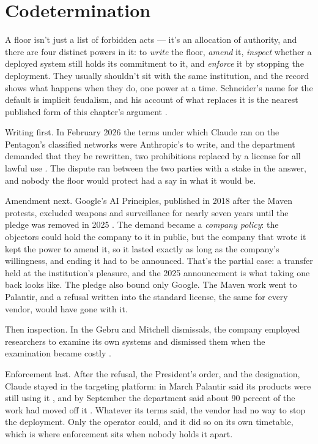 \chapter{Codetermination}
\label{sec:10}
A floor isn't just a list of forbidden acts — it's an allocation of authority, and there are four distinct powers in it: to \emph{write} the floor, \emph{amend} it, \emph{inspect} whether a deployed system still holds its commitment to it, and \emph{enforce} it by stopping the deployment. They usually shouldn't sit with the same institution, and the record shows what happens when they do, one power at a time. Schneider's name for the default is implicit feudalism, and his account of what replaces it is the nearest published form of this chapter's argument \autocite{schneider2024governable}.

Writing first. In February 2026 the terms under which Claude ran on the Pentagon's classified networks were Anthropic's to write, and the department demanded that they be rewritten, two prohibitions replaced by a license for all lawful use \autocite{defenseone2026ultimatum,volokh2026anthropiccontract}. The dispute ran between the two parties with a stake in the answer, and nobody the floor would protect had a say in what it would be.

Amendment next. Google's AI Principles, published in 2018 after the Maven protests, excluded weapons and surveillance \autocite{castelino2018google,conger2018maven,pichai2018principles} for nearly seven years until the pledge was removed in 2025 \autocite{google2025principles}. The demand became a \emph{company policy}: the objectors could hold the company to it in public, but the company that wrote it kept the power to amend it, so it lasted exactly as long as the company's willingness, and ending it had to be announced. That's the partial case: a transfer held at the institution's pleasure, and the 2025 announcement is what taking one back looks like. The pledge also bound only Google. The Maven work went to Palantir, and a refusal written into the standard license, the same for every vendor, would have gone with it.

Then inspection. In the Gebru and Mitchell dismissals, the company employed researchers to examine its own systems and dismissed them when the examination became costly \autocite{dickey2020gebru,dickey2021mitchell}.

Enforcement last. After the refusal, the President's order, and the designation, Claude stayed in the targeting platform: in March Palantir said its products were still using it \autocite{cnbc2026karp}, and by September the department said about 90 percent of the work had moved off it \autocite{defensescoop2026michael}. Whatever its terms said, the vendor had no way to stop the deployment. Only the operator could, and it did so on its own timetable, which is where enforcement sits when nobody holds it apart.
